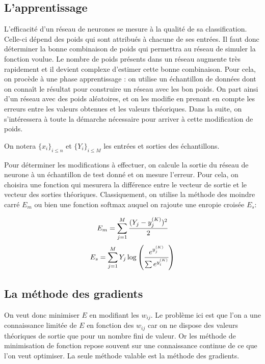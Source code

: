 \subsection{L'apprentissage}

L'efficacité d'un réseau de neurones se mesure à la qualité de sa classification. Celle-ci dépend des poids qui sont attribués à chacune de ses entrées. Il faut donc déterminer la bonne combinaison de poids qui permettra au réseau de simuler la fonction voulue. Le nombre de poids présents dans un réseau augmente très rapidement et il devient complexe d'estimer cette bonne combinaison. Pour cela, on procède à une phase apprentissage : on utilise un échantillon de données dont on connaît le résultat pour construire un réseau avec les bon poids. On part ainsi d'un réseau avec des poids aléatoires, et on les modifie en prenant en compte les erreurs entre les valeurs obtenues et les valeurs théoriques. Dans la suite, on s'intéressera à toute la démarche nécessaire pour arriver à cette modification de poids.

\medskip

On notera $\{x_i\}_{i \leq n}$ et $\{Y_i\}_{i \leq M}$ les entrées et sorties des échantillons.

\medskip

Pour déterminer les modifications à effectuer, on calcule la sortie du réseau de neurone à un échantillon de test donné et on mesure l'erreur. Pour cela, on choisira une fonction qui mesurera la différence entre le vecteur de sortie et le vecteur des sorties théoriques. Classiquement, on utilise la méthode des moindre carré $E_m$ ou bien une fonction softmax auquel on rajoute une enropie croisée $E_s$:

\[E_m = \sum_{j = 1}^{M} \cfrac{(Y_j - y_j^{(K)})^2}{2}\]
\[E_s = \sum_{j = 1}^{M} Y_j \log \left(\cfrac{e^{y_j^{(K)}}}{\sum e^{y_i^{(K)}}}\right)\]

\subsection{La méthode des gradients}

On veut donc minimiser $E$ en modifiant les $w_{ij}$. Le problème ici est que l'on a une connaissance limitée de $E$ en fonction des $w_{ij}$ car on ne dispose des valeurs théoriques de sortie que pour un nombre fini de valeur. Or les méthode de minimisation de fonction repose souvent sur une connaissance continue de ce que l'on veut optimiser. La seule méthode valable est la méthode des gradients.

